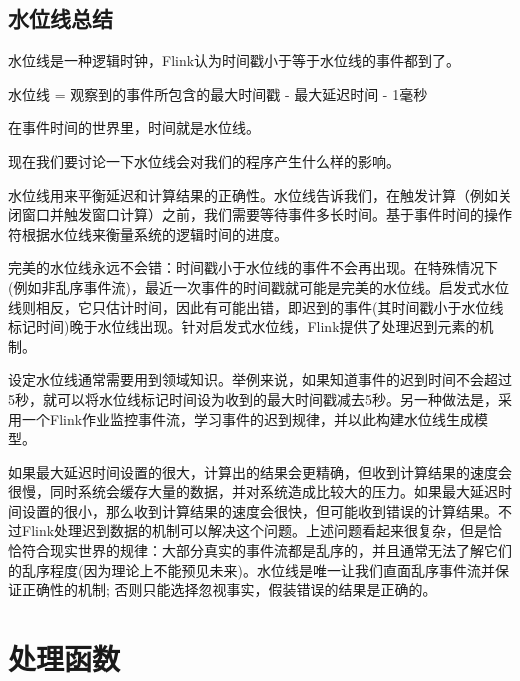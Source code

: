 \documentclass[cn,11pt,chinese]{elegantbook}
\renewenvironment{quote}{\begin{customblockquote}\list{}{\rightmargin=0em\leftmargin=0em}%
\item\relax\color{blockquote-text}\ignorespaces}{\unskip\unskip\endlist\end{customblockquote}}
\begin{document}
\hypertarget{ux6c34ux4f4dux7ebfux603bux7ed3}{%
\subsection{水位线总结}\label{ux6c34ux4f4dux7ebfux603bux7ed3}}

\begin{quote}
水位线是一种逻辑时钟，Flink认为时间戳小于等于水位线的事件都到了。
\end{quote}

\begin{quote}
水位线 = 观察到的事件所包含的最大时间戳 - 最大延迟时间 - 1毫秒
\end{quote}

\begin{quote}
在事件时间的世界里，时间就是水位线。
\end{quote}

现在我们要讨论一下水位线会对我们的程序产生什么样的影响。

水位线用来平衡延迟和计算结果的正确性。水位线告诉我们，在触发计算（例如关闭窗口并触发窗口计算）之前，我们需要等待事件多长时间。基于事件时间的操作符根据水位线来衡量系统的逻辑时间的进度。

完美的水位线永远不会错：时间戳小于水位线的事件不会再出现。在特殊情况下(例如非乱序事件流)，最近一次事件的时间戳就可能是完美的水位线。启发式水位线则相反，它只估计时间，因此有可能出错，即迟到的事件(其时间戳小于水位线标记时间)晚于水位线出现。针对启发式水位线，Flink提供了处理迟到元素的机制。

设定水位线通常需要用到领域知识。举例来说，如果知道事件的迟到时间不会超过5秒，就可以将水位线标记时间设为收到的最大时间戳减去5秒。另一种做法是，采用一个Flink作业监控事件流，学习事件的迟到规律，并以此构建水位线生成模型。

如果最大延迟时间设置的很大，计算出的结果会更精确，但收到计算结果的速度会很慢，同时系统会缓存大量的数据，并对系统造成比较大的压力。如果最大延迟时间设置的很小，那么收到计算结果的速度会很快，但可能收到错误的计算结果。不过Flink处理迟到数据的机制可以解决这个问题。上述问题看起来很复杂，但是恰恰符合现实世界的规律：大部分真实的事件流都是乱序的，并且通常无法了解它们的乱序程度(因为理论上不能预见未来)。水位线是唯一让我们直面乱序事件流并保证正确性的机制;
否则只能选择忽视事实，假装错误的结果是正确的。

\hypertarget{ux5904ux7406ux51fdux6570}{%
\section{处理函数}\label{ux5904ux7406ux51fdux6570}}
\end{document}
